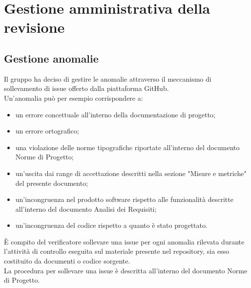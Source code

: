 
\section{Gestione amministrativa della revisione}
	\subsection{Gestione anomalie}
		Il gruppo ha deciso di gestire le anomalie attraverso il meccanismo di sollevamento di issue offerto dalla piattaforma GitHub.\\
		Un'anomalia può per esempio corrispondere a:
		\begin{itemize}
			\item un errore concettuale all'interno della documentazione di progetto;
			\item un errore ortografico;
			\item una violazione delle norme tipografiche riportate all'interno del documento Norme di Progetto;
			\item un'uscita dai range di accettazione descritti nella sezione "Misure e metriche" del presente documento;
			\item un'incongruenza nel prodotto software rispetto alle funzionalità descritte all'interno del documento Analisi dei Requisiti;
			\item un'incongruenza del codice rispetto a quanto è stato progettato.
		\end{itemize}
		È compito del verificatore sollevare una issue per ogni anomalia rilevata durante l'attività di controllo eseguita sul materiale presente 
		nel repository, sia esso costituito da documenti o codice sorgente.\\
		La procedura per sollevare una issue è descritta all'interno del documento Norme di Progetto.